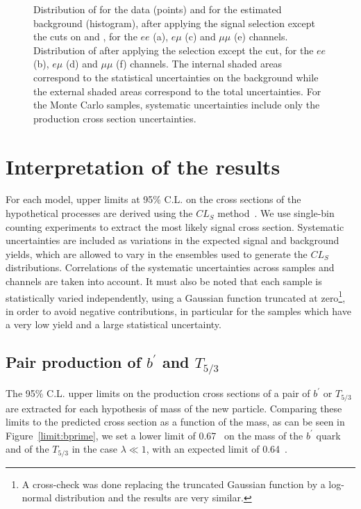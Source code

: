 \begin{figure}[t]
\caption{Distribution of \met{} for the data (points) and for the estimated background (histogram),
after applying the signal selection except the cuts on \met{} and \HT{}, for the $ee$ (a), $e\mu$ (c)
and $\mu\mu$ (e) channels. Distribution of \HT{} after applying the selection except the \HT{} cut,
for the $ee$ (b), $e\mu$ (d) and $\mu\mu$ (f) channels. The internal shaded areas correspond to the
statistical uncertainties on the background while the external shaded areas correspond to the total
uncertainties. For the Monte Carlo samples, systematic uncertainties include only the production 
cross section uncertainties.}\label{fig:signal}
\end{figure}

\section{Interpretation of the results}\label{sect:interpretation}
For each model, upper limits at 95\% C.L. on the cross sections of the hypothetical
processes are derived using the $CL_S$ method~\cite{Junk:1999kv,0954-3899-28-10-313}. We use
single-bin counting experiments to extract the most likely signal cross section.
Systematic uncertainties are included as variations in the expected signal and background
yields, which are allowed to vary in the ensembles used to generate the $CL_S$ distributions.
Correlations of the systematic uncertainties across samples and channels are taken into account. 
It must also be noted that each sample is statistically varied independently, using a Gaussian function
truncated at zero\footnote{A cross-check was done replacing the truncated Gaussian function by a 
log-normal distribution and the results are very similar.}, in order to avoid negative contributions, 
in particular for the samples which have a very low yield and a large statistical uncertainty.

\subsection{Pair production of $b^\prime$ and $T_{5/3}$}
The 95\% C.L. upper limits on the production cross sections of a pair of $b^\prime$ or $T_{5/3}$ 
are extracted
for each hypothesis of mass of the new particle. Comparing these limits to the predicted cross section
as a function of the mass, as can be seen in Figure~\ref{limit:bprime}, we set a lower limit of 
0.67~\TeV{} on the mass of the $b^\prime$ quark and of the $T_{5/3}$ in the case $\lambda\ll1$, with an
expected limit of 0.64~\TeV{}.

